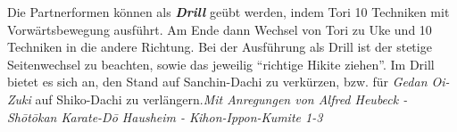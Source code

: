 \begin{tcolorbox}[width=\textwidth,height=\textheight,right=12pt,left=12pt,colframe=GKD,colback=white,fonttitle=\bfseries,coltitle=white,title=Kihon Ippon Kumite]
\begin{center}
\begin{minipage}[t]{\textwidth-2\tabcolsep}
			{\footnotesize Die Partnerformen können als \textbf{\textit{Drill}} geübt werden, indem Tori 10 Techniken mit Vorwärtsbewegung ausführt. Am Ende dann Wechsel von Tori zu Uke und 10 Techniken in die andere Richtung. Bei der Ausführung als Drill ist der stetige Seitenwechsel zu beachten, sowie das jeweilig \textquotedblleft richtige Hikite ziehen\textquotedblright. Im Drill bietet es sich an, den Stand auf Sanchin-Dachi zu verkürzen, bzw. für \textit{Gedan Oi-Zuki} auf Shiko-Dachi zu verlängern.\linebreak\medskip\textit{{\tiny Mit Anregungen von Alfred Heubeck - Sh\={o}t\={o}kan Karate-D\={o} Hausheim - Kihon-Ippon-Kumite 1-3}}}
		\end{minipage}
		\end{center}\null\vfill\null
\end{tcolorbox}